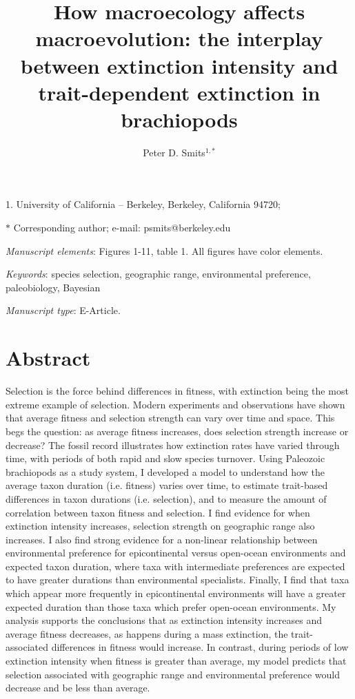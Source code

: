 \documentclass[11pt]{article}
\title{How macroecology affects macroevolution: the interplay between extinction intensity and trait-dependent extinction in brachiopods}
\author{Peter D. Smits$^{1,\ast}$}
\date{}
\begin{document}
\maketitle

\noindent{} 1. University of California -- Berkeley, Berkeley, California 94720;

\noindent{} $\ast$ Corresponding author; e-mail: psmits@berkeley.edu

\bigskip

\textit{Manuscript elements}: Figures 1-11, table 1. All figures have color elements.

\bigskip

\textit{Keywords}: species selection, geographic range, environmental preference, paleobiology, Bayesian

\bigskip

\textit{Manuscript type}: E-Article.

\bigskip


\linenumbers{}
\modulolinenumbers[3]

\newpage{}

\section*{Abstract}

Selection is the force behind differences in fitness, with extinction being the most extreme example of selection. Modern experiments and observations have shown that average fitness and selection strength can vary over time and space. This begs the question: as average fitness increases, does selection strength increase or decrease? The fossil record illustrates how extinction rates have varied through time, with periods of both rapid and slow species turnover. Using Paleozoic brachiopods as a study system, I developed a model to understand how the average taxon duration (i.e. fitness) varies over time, to estimate trait-based differences in taxon durations (i.e. selection), and to measure the amount of correlation between taxon fitness and selection. I find evidence for when extinction intensity increases, selection strength on geographic range also increases. I also find strong evidence for a non-linear relationship between environmental preference for epicontinental versus open-ocean environments and expected taxon duration, where taxa with intermediate preferences are expected to have greater durations than environmental specialists. Finally, I find that taxa which appear more frequently in epicontinental environments will have a greater expected duration than those taxa which prefer open-ocean environments. My analysis supports the conclusions that as extinction intensity increases and average fitness decreases, as happens during a mass extinction, the trait-associated differences in fitness would increase. In contrast, during periods of low extinction intensity when fitness is greater than average, my model predicts that selection associated with geographic range and environmental preference would decrease and be less than average.
\end{document}

